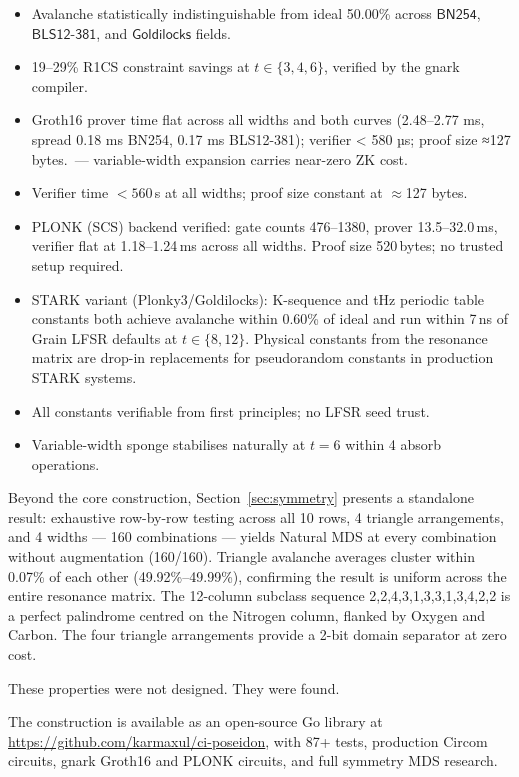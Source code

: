 \documentclass[preprint]{iacrtrans}
\newcommand{\BN}{\ensuremath{\mathsf{BN254}}}
\newcommand{\BLS}{\ensuremath{\mathsf{BLS12\text{-}381}}}
\newcommand{\GL}{\ensuremath{\mathsf{Goldilocks}}}
\begin{document}
\begin{itemize}
  \item Avalanche statistically indistinguishable from ideal 50.00\% across
    $\BN$, $\BLS$, and $\GL$ fields.
  \item 19--29\% R1CS constraint savings at $t \in \{3,4,6\}$, verified by
    the gnark compiler.
  \item Groth16 prover time flat across all widths and both curves (2.48–2.77 ms, spread 0.18 ms BN254, 0.17 ms BLS12-381); verifier < 580 µs; proof size ≈127 bytes.~---
    variable-width expansion carries near-zero ZK cost.
  \item Verifier time $<560$\,\textmu{}s at all widths; proof size constant
    at $\approx$127 bytes.
  \item PLONK (SCS) backend verified: gate counts 476--1380, prover
    13.5--32.0\,ms, verifier flat at 1.18--1.24\,ms across all widths.
    Proof size 520\,bytes; no trusted setup required.
  \item STARK variant (Plonky3/Goldilocks): K-sequence and tHz periodic
  table constants both achieve avalanche within 0.60\% of ideal and run
  within 7\,ns of Grain LFSR defaults at $t \in \{8,12\}$. Physical
  constants from the resonance matrix are drop-in replacements for
  pseudorandom constants in production STARK systems.
  \item All constants verifiable from first principles; no LFSR seed trust.
  \item Variable-width sponge stabilises naturally at $t=6$ within 4 absorb
    operations.
\end{itemize}

Beyond the core construction, Section~\ref{sec:symmetry} presents a
standalone result: exhaustive row-by-row testing across all 10 rows,
4 triangle arrangements, and 4 widths — 160 combinations — yields Natural
MDS at every combination without augmentation (160/160). Triangle avalanche
averages cluster within 0.07\% of each other (49.92\%--49.99\%), confirming
the result is uniform across the entire resonance matrix. The 12-column
subclass sequence 2,2,4,3,1,3,3,1,3,4,2,2 is a perfect palindrome
centred on the Nitrogen column, flanked by Oxygen and Carbon. The four
triangle arrangements provide a 2-bit domain separator at zero cost.

These properties were not designed. They were found.

The construction is available as an open-source Go library at
\url{https://github.com/karmaxul/ci-poseidon}, with 87+ tests, production
Circom circuits, gnark Groth16 and PLONK circuits, and full symmetry MDS research.
\end{document}
